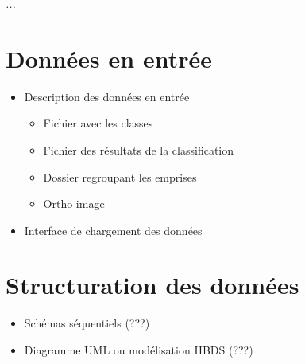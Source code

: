 
\textit{...}

\section{Données en entrée}

\begin{itemize}
	\item Description des données en entrée
	\begin{itemize}
		\item Fichier avec les classes
		\item Fichier des résultats de la classification
		\item Dossier regroupant les emprises
		\item Ortho-image
	\end{itemize}
	\item Interface de chargement des données
\end{itemize}

\section{Structuration des données}

\begin{itemize}
	\item Schémas séquentiels (???)
	\item Diagramme UML ou modélisation HBDS (???)
\end{itemize}
